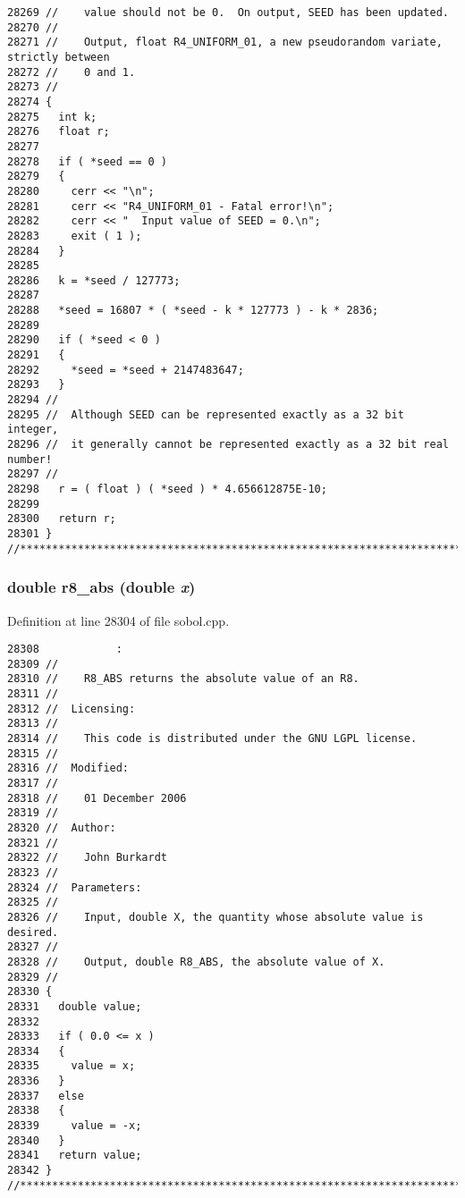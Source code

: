 \begin{Code}
\begin{verbatim}
28269 //    value should not be 0.  On output, SEED has been updated.
28270 //
28271 //    Output, float R4_UNIFORM_01, a new pseudorandom variate, strictly between
28272 //    0 and 1.
28273 //
28274 {
28275   int k;
28276   float r;
28277 
28278   if ( *seed == 0 )
28279   {
28280     cerr << "\n";
28281     cerr << "R4_UNIFORM_01 - Fatal error!\n";
28282     cerr << "  Input value of SEED = 0.\n";
28283     exit ( 1 );
28284   }
28285 
28286   k = *seed / 127773;
28287 
28288   *seed = 16807 * ( *seed - k * 127773 ) - k * 2836;
28289 
28290   if ( *seed < 0 )
28291   {
28292     *seed = *seed + 2147483647;
28293   }
28294 //
28295 //  Although SEED can be represented exactly as a 32 bit integer,
28296 //  it generally cannot be represented exactly as a 32 bit real number!
28297 //
28298   r = ( float ) ( *seed ) * 4.656612875E-10;
28299 
28300   return r;
28301 }
//****************************************************************************80
\end{verbatim}
\end{Code}


\subsubsection{\setlength{\rightskip}{0pt plus 5cm}double r8\_\-abs (double {\em x})}\label{test_2sobol_8H_764d529be849adbbb2865d6c886710dc}




Definition at line 28304 of file sobol.cpp.

\begin{Code}\begin{verbatim}28308            :
28309 //
28310 //    R8_ABS returns the absolute value of an R8.
28311 //
28312 //  Licensing:
28313 //
28314 //    This code is distributed under the GNU LGPL license. 
28315 //
28316 //  Modified:
28317 //
28318 //    01 December 2006
28319 //
28320 //  Author:
28321 //
28322 //    John Burkardt
28323 //
28324 //  Parameters:
28325 //
28326 //    Input, double X, the quantity whose absolute value is desired.
28327 //
28328 //    Output, double R8_ABS, the absolute value of X.
28329 //
28330 {
28331   double value;
28332 
28333   if ( 0.0 <= x )
28334   {
28335     value = x;
28336   } 
28337   else
28338   {
28339     value = -x;
28340   }
28341   return value;
28342 }
//****************************************************************************80
\end{verbatim}
\end{Code}


